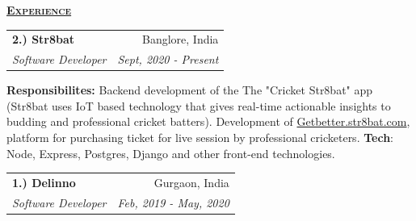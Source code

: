 \documentclass[11pt, a4paper]{article}
\begin{document}
\setlength\tabcolsep{0pt}
\begin{flushleft}
    \uline{\textsc{\large{\textbf{Experience}}}\hfill}
    \newline
    \newline
\setlength\tabcolsep{0pt}
\begin{tabularx}{\textwidth}{X r}
    \large{\textbf{2.) Str8bat}} & Banglore, India\\
    \textit{Software Developer} & \textit {Sept, 2020 - Present}\\
\end{tabularx}
\begin{itemize}
    \textbf{Responsibilites:}
    Backend development of the The "Cricket Str8bat" app (Str8bat uses IoT based
    technology that gives real-time actionable insights to budding and professional
    cricket batters).
    Development of \href{https://getbetter.str8bat.com}{Getbetter.str8bat.com},
    platform for purchasing ticket for live session by professional cricketers.
    \newline
    \textbf{Tech}: Node, Express, Postgres, Django and other front-end technologies.
\end{itemize}

    \begin{tabularx}{\textwidth}{X r}
        \large{\textbf{1.) Delinno}} & Gurgaon, India\\
        \textit{Software Developer}  & \textit {Feb, 2019 - May, 2020}\\
    \end{tabularx}
\end{flushleft}
\end{document}
